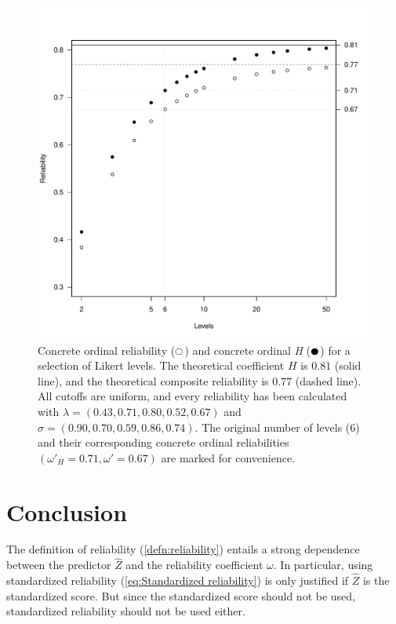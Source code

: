 \documentclass[twoside]{article}
\begin{document}
\begin{figure}
\noindent \begin{centering}
\includegraphics[scale=0.5]{chunks/ordinals}
\par\end{centering}
\caption{\label{fig:Ordinal reliability}Concrete ordinal reliability ($\fullmoon$)
and concrete ordinal \textit{H} ($\newmoon$) for a selection of Likert levels. The
theoretical coefficient $H$ is $0.81$ (solid line), and the theoretical
composite reliability is $0.77$ (dashed line). All cutoffs are uniform,
and every reliability has been calculated with $\lambda=(0.43,0.71,0.80,0.52,0.67)$
and $\sigma=(0.90,0.70,0.59,0.86,0.74)$. The original number of levels
($6$) and their corresponding concrete ordinal reliabilities $(\omega'_{H}=0.71,\omega'=0.67)$
are marked for convenience.}
\end{figure}

\section{Conclusion}
The definition of reliability (\cref{defn:reliability}) entails a strong dependence between the predictor $\hat{Z}$ and the reliability coefficient $\omega$. In particular, using standardized reliability (\cref{eq:Standardized reliability}) is only justified if $\hat{Z}$ is the standardized score. But since the standardized score should not be used, standardized reliability should not be used either.
\end{document}
